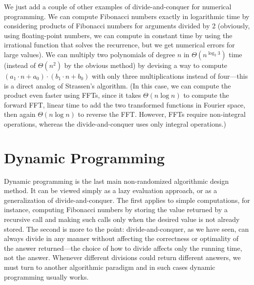 \documentclass[11pt]{article}
\begin{document}
We just add a couple of other examples of divide-and-conquer for numerical
programming.  We can compute Fibonacci numbers exactly in logarithmic time
by considering products of Fibonacci numbers for arguments divided by 2
(obviously,
using floating-point numbers, we can compute in constant time by using
the irrational function that solves the recurrence, but we get numerical
errors for large values).  We can multiply two polynomials of degree $n$
in $\Theta(n^{\log_2 3})$ time (instead of $\Theta(n^2)$ by the obvious method)
by devising a way to compute $(a_1\cdot n+a_0)\cdot (b_1\cdot n+b_0)$ with
only three multiplications instead of four---this is a direct analog of
Strassen's algorithm.  (In this case, we can compute the product even faster
using FFTs, since it takes $\Theta(n\log n)$ to compute the forward FFT,
linear time to add the two transformed functions in Fourier space, then
again $\Theta(n\log n)$ to reverse the FFT.  However, FFTs require non-integral
operations, whereas the divide-and-conquer uses only integral operations.)

\section{Dynamic Programming}
Dynamic programming is the last main non-randomized algorithmic design method.
It can be viewed simply as a lazy evaluation approach, or as a generalization
of divide-and-conquer.  The first applies to simple computations, for instance,
computing Fibonacci numbers by storing the value returned by a recursive
call and making such calls only when the desired value is not already stored.
The second is more to the point: divide-and-conquer, as we have seen, can
always divide in any manner without affecting the correctness or optimality
of the answer returned---the choice of how to divide affects only the
running time, not the answer.  Whenever different divisions could return
different answers, we must turn to another algorithmic paradigm and in such
cases dynamic programming usually works.
\end{document}
